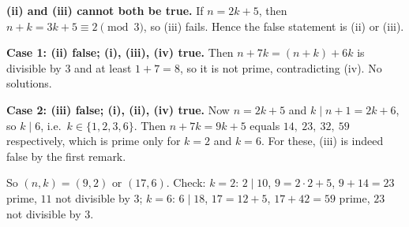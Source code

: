 \textbf{(ii) and (iii) cannot both be true.} If $n=2k+5$, then $n+k=3k+5\equiv2\pmod3$, so (iii) fails. Hence the false statement is (ii) or (iii).

\textbf{Case 1: (ii) false; (i), (iii), (iv) true.} Then $n+7k=(n+k)+6k$ is divisible by $3$ and at least $1+7=8$, so it is not prime, contradicting (iv). No solutions.

\textbf{Case 2: (iii) false; (i), (ii), (iv) true.} Now $n=2k+5$ and $k\mid n+1=2k+6$, so $k\mid6$, i.e.\ $k\in\{1,2,3,6\}$. Then $n+7k=9k+5$ equals $14,\ 23,\ 32,\ 59$ respectively, which is prime only for $k=2$ and $k=6$. For these, (iii) is indeed false by the first remark.

So $\boxed{(n,k)=(9,2)\text{ or }(17,6)}$. Check: $k=2$: $2\mid10$, $9=2\cdot2+5$, $9+14=23$ prime, $11$ not divisible by $3$; $k=6$: $6\mid18$, $17=12+5$, $17+42=59$ prime, $23$ not divisible by $3$.
